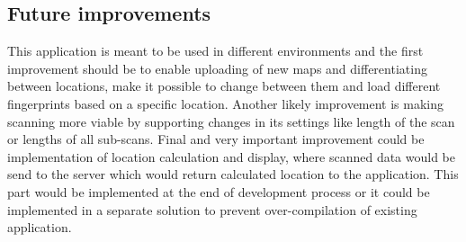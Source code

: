 \subsection{Future improvements}\label{sec:FutureImprovements}
This application is meant to be used in different environments and the first improvement should be to enable uploading of new maps and differentiating between locations, make it possible to change between them and load different fingerprints based on a specific location. Another likely improvement is making scanning more viable by supporting changes in its settings like length of the scan or lengths of all sub-scans. Final and very important improvement could be implementation of location calculation and display, where scanned data would be send to the server which would return calculated location to the application. This part would be implemented at the end of development process or it could be implemented in a separate solution to prevent over-compilation of existing application.